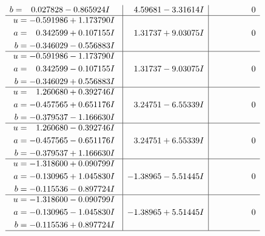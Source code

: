 \documentclass[1p]{elsarticle_modified}
\theoremstyle{definition}
\begin{document}
$$\begin{array}{c|c|c}
\begin{aligned}
b &= \phantom{-}0.027828 - 0.865924 I\end{aligned}
 & \phantom{-}4.59681 - 3.31614 I & \phantom{-0.000000 } 0 \\ \hline\begin{aligned}
u &= -0.591986 + 1.173790 I \\
a &= \phantom{-}0.342599 + 0.107155 I \\
b &= -0.346029 - 0.556883 I\end{aligned}
 & \phantom{-}1.31737 + 9.03075 I & \phantom{-0.000000 } 0 \\ \hline\begin{aligned}
u &= -0.591986 - 1.173790 I \\
a &= \phantom{-}0.342599 - 0.107155 I \\
b &= -0.346029 + 0.556883 I\end{aligned}
 & \phantom{-}1.31737 - 9.03075 I & \phantom{-0.000000 } 0 \\ \hline\begin{aligned}
u &= \phantom{-}1.260680 + 0.392746 I \\
a &= -0.457565 + 0.651176 I \\
b &= -0.379537 - 1.166630 I\end{aligned}
 & \phantom{-}3.24751 - 6.55339 I & \phantom{-0.000000 } 0 \\ \hline\begin{aligned}
u &= \phantom{-}1.260680 - 0.392746 I \\
a &= -0.457565 - 0.651176 I \\
b &= -0.379537 + 1.166630 I\end{aligned}
 & \phantom{-}3.24751 + 6.55339 I & \phantom{-0.000000 } 0 \\ \hline\begin{aligned}
u &= -1.318600 + 0.090799 I \\
a &= -0.130965 + 1.045830 I \\
b &= -0.115536 - 0.897724 I\end{aligned}
 & -1.38965 - 5.51445 I & \phantom{-0.000000 } 0 \\ \hline\begin{aligned}
u &= -1.318600 - 0.090799 I \\
a &= -0.130965 - 1.045830 I \\
b &= -0.115536 + 0.897724 I\end{aligned}
 & -1.38965 + 5.51445 I & \phantom{-0.000000 } 0\\
 \hline 
 \end{array}$$\newpage$$\begin{array}{c|c|c}  

\end{array}$$
\end{document}
